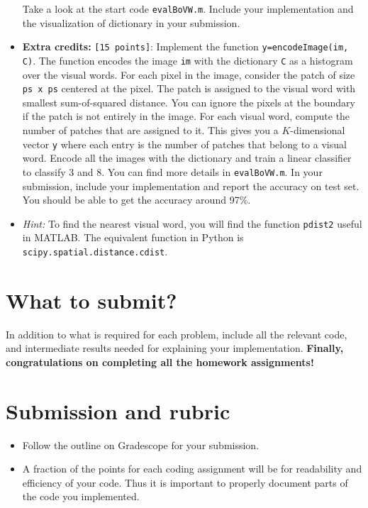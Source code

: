 \documentclass[10pt,letterpaper]{article}
\newcommand{\cmd}[1] {{\color{blue}\texttt{#1}}}
\begin{document}
\begin{itemize}
Take a look at the start code \cmd{evalBoVW.m}. Include your implementation and the visualization of dictionary in your submission.

\item \textbf{Extra credits:} \cmd{[15 points]}: Implement the function \cmd{y=encodeImage(im, C)}. The function encodes the image \cmd{im} with the dictionary \cmd{C} as a histogram over the visual words. For each pixel in the image, consider the patch of size \cmd{ps x ps} centered at the pixel. The patch is assigned to the visual word with smallest sum-of-squared distance. You can ignore the pixels at the boundary if the patch is not entirely in the image. For each visual word, compute the number of patches that are assigned to it. This gives you a $K$-dimensional vector \cmd{y} where each entry is the number of patches that belong to a visual word. Encode all the images with the dictionary and train a linear classifier to classify 3 and 8. You can find more details in \cmd{evalBoVW.m}. In your submission, include your implementation and report the accuracy on test set. You should be able to get the accuracy around 97\%. 

\item \textit{Hint:}  To find the nearest visual word, you will find the function \cmd{pdist2} useful in MATLAB. The equivalent function in Python is \cmd{scipy.spatial.distance.cdist}.

\end{itemize}
\section{What to submit?}
In addition to what is required for each problem, include all the relevant code, and intermediate results needed for explaining your implementation. \textbf{Finally, congratulations on completing all the homework assignments!}

\section{Submission and rubric}

\begin{itemize}
\item Follow the outline on Gradescope for your submission. 
\item A fraction of the points for each coding assignment will be for
  readability and efficiency of your code. Thus it is important to
  properly document parts of the code you implemented.
\end{itemize}
\end{document}
